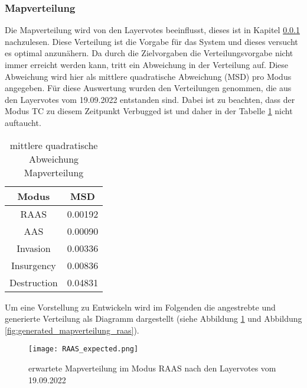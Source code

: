         \subsubsection{Mapverteilung}
            Die Mapverteilung wird von den Layervotes beeinflusst, dieses ist in Kapitel \ref{}  nachzulesen.
            Diese Verteilung ist die Vorgabe für das System und dieses versucht es optimal anzunähern. Da durch die 
            Zielvorgaben die Verteilungsvorgabe nicht immer erreicht werden kann, tritt ein Abweichung in der Verteilung auf.
            Diese Abweichung wird hier als mittlere quadratische Abweichung (MSD)  pro Modus angegeben.
            Für diese Auswertung wurden den Verteilungen genommen, die aus den Layervotes vom 19.09.2022 entstanden sind.
            Dabei ist zu beachten, dass der Modus TC zu diesem Zeitpunkt \glqq{}Verbugged\grqq{} ist und daher 
            in der Tabelle \ref{t:Ergebnisse:fehler_Mapverteilung} nicht auftaucht.\\
            \begin{table}[h]
                \centering
                \begin{tabular}{|| c c ||}
                    \hline
                    Modus & MSD \\
                    \hline
                    \hline
                    RAAS & 0.00192 \\
                    \hline
                    AAS & 0.00090 \\
                    \hline
                    Invasion & 0.00336 \\
                    \hline
                    Insurgency & 0.00836 \\
                    \hline
                    Destruction & 0.04831 \\
                    \hline
                \end{tabular}
                \caption{mittlere quadratische Abweichung Mapverteilung}
                \label{t:Ergebnisse:fehler_Mapverteilung}
            \end{table}
            
            Um eine Vorstellung zu Entwickeln wird im Folgenden die angestrebte und generierte Verteilung als 
            Diagramm dargestellt (siehe Abbildung \ref{fig:expected_mapverteilung_raas} 
            und Abbildung \ref{fig:generated_mapverteilung_raas}).

            \begin{figure}[h]
                \centering
                \texttt{[image: RAAS\_expected.png]}
                \caption{erwartete Mapverteilung im Modus RAAS nach den Layervotes vom 19.09.2022}
                \label{fig:expected_mapverteilung_raas}
            \end{figure}

